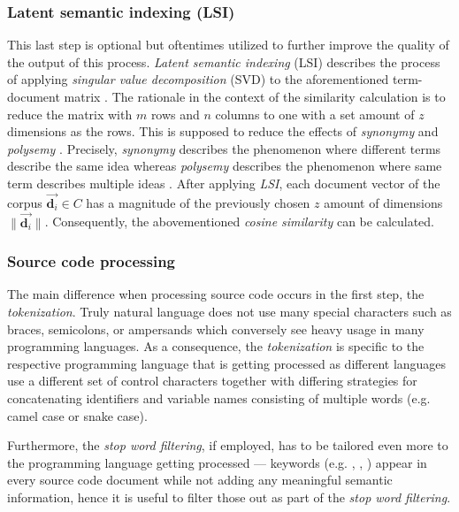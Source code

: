 \documentclass[12pt,a4paper]{report}
\begin{document}
\subsubsection{Latent semantic indexing (LSI)}
This last step is optional but oftentimes utilized to further improve the quality
of the output of this process. \textit{Latent semantic indexing} (LSI) describes
the process of applying \textit{singular value decomposition} (SVD) to
the aforementioned term-document matrix \cite{deerwester1990lsi}. %
The rationale in the context of the similarity calculation is
to reduce the matrix with \(m\) rows and \(n\) columns to one with a
set amount of \(z\) dimensions as the rows.
This is supposed to reduce the effects of \textit{synonymy} and
\textit{polysemy} \cite{deerwester1990lsi}.
Precisely, \textit{synonymy} describes the phenomenon where different terms describe
the same idea \cite{press2011oxford} whereas \textit{polysemy} describes the phenomenon
where same term describes multiple ideas \cite{press2011oxford}.
After applying \textit{LSI}, each document vector of the corpus \(\vec{\mathbf d_i} \in C\)
has a magnitude of the previously chosen \(z\) amount of dimensions \(\|\vec{\mathbf d_i}\|\).
Consequently, the abovementioned \textit{cosine similarity} can be calculated.


\subsubsection{Source code processing}
The main difference when processing source code occurs in the first step,
the \textit{tokenization}.
Truly natural language does not use many special characters such as
braces, semicolons, or ampersands which conversely see heavy usage in
many programming languages.
As a consequence, the \textit{tokenization} is specific to the respective
programming language that is getting processed as different languages use a
different set of control characters together with differing strategies
for concatenating identifiers and variable names consisting of
multiple words (e.g. camel case or snake case).

Furthermore, the \textit{stop word filtering}, if employed, has to be tailored
even more to the programming language getting processed ---
keywords (e.g. , , ) appear in
every source code document while not adding any meaningful semantic information,
hence it is useful to filter those out as part of the \textit{stop word filtering}.
\end{document}

